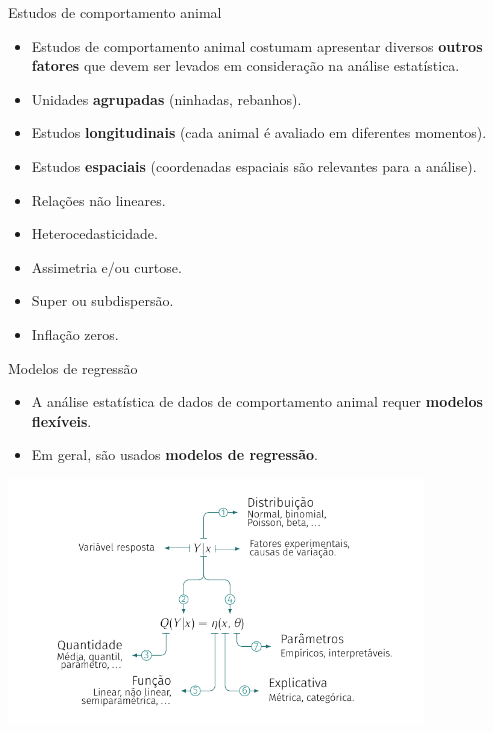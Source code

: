 \documentclass[
  ignorenonframetext,
  serif,
  professionalfont,
  usenames,
  dvipsnames,
  aspectratio = 169]{beamer}
\providecommand{\tightlist}{%
  \setlength{\itemsep}{0pt}\setlength{\parskip}{0pt}}
\renewcommand{\tightlist}{%
  \setlength{\itemsep}{0\baselineskip}
  \setlength{\parskip}{0.25\baselineskip}
}
\def\beginAHalfColumn{\begin{minipage}{0.49\textwidth}}%
\def\beginAThirdColumn{\begin{minipage}{0.31\textwidth}}%
\def\beginTwoThirdsColumn{\begin{minipage}{0.64\textwidth}}%
\def\endColumns{\end{minipage}}%
\begin{document}
\begin{frame}{Estudos de comportamento animal}
\protect\hypertarget{estudos-de-comportamento-animal-2}{}
\begin{itemize}
\tightlist
\item
  Estudos de comportamento animal costumam apresentar diversos
  \textbf{outros fatores} que devem ser levados em consideração na
  análise estatística.
\end{itemize}

\beginAHalfColumn

\begin{itemize}
\item
  Unidades \textbf{agrupadas} (ninhadas, rebanhos).
\item
  Estudos \textbf{longitudinais} (cada animal é avaliado em diferentes
  momentos).
\item
  Estudos \textbf{espaciais} (coordenadas espaciais são relevantes para
  a análise).
\end{itemize}

\endColumns
\beginAHalfColumn

\begin{itemize}
\item
  Relações não lineares.
\item
  Heterocedasticidade.
\item
  Assimetria e/ou curtose.
\item
  Super ou subdispersão.
\item
  Inflação zeros.
\end{itemize}

\endColumns
\end{frame}

\begin{frame}{Modelos de regressão}
\protect\hypertarget{modelos-de-regressuxe3o}{}
\beginAThirdColumn

\begin{itemize}
\item
  A análise estatística de dados de comportamento animal requer
  \textbf{modelos flexíveis}.
\item
  Em geral, são usados \textbf{modelos de regressão}.
\end{itemize}

\endColumns
\beginTwoThirdsColumn

\begin{center}\includegraphics[width=11cm]{./img/modelos_regressao} \end{center}

\endColumns
\end{frame}
\end{document}
